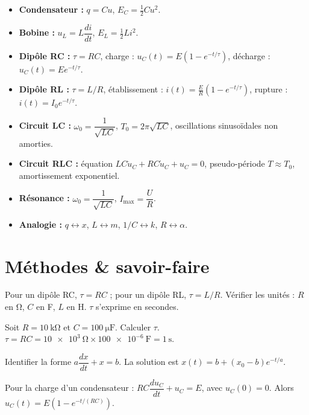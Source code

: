 \begin{synthese}
\begin{itemize}
  \item \textbf{Condensateur :} $q = C u$, $E_C = \frac{1}{2} C u^2$.
  \item \textbf{Bobine :} $u_L = L \dfrac{di}{dt}$, $E_L = \frac{1}{2} L i^2$.
  \item \textbf{Dipôle RC :} $\tau = RC$, charge : $u_C(t) = E(1 - e^{-t/\tau})$, décharge : $u_C(t) = E e^{-t/\tau}$.
  \item \textbf{Dipôle RL :} $\tau = L/R$, établissement : $i(t) = \frac{E}{R}(1 - e^{-t/\tau})$, rupture : $i(t) = I_0 e^{-t/\tau}$.
  \item \textbf{Circuit LC :} $\omega_0 = \dfrac{1}{\sqrt{LC}}$, $T_0 = 2\pi\sqrt{LC}$, oscillations sinusoïdales non amorties.
  \item \textbf{Circuit RLC :} équation $LC \ddot{u}_C + RC \dot{u}_C + u_C = 0$, pseudo-période $T \approx T_0$, amortissement exponentiel.
  \item \textbf{Résonance :} $\omega_0 = \dfrac{1}{\sqrt{LC}}$, $I_{\text{max}} = \dfrac{U}{R}$.
  \item \textbf{Analogie :} $q \leftrightarrow x$, $L \leftrightarrow m$, $1/C \leftrightarrow k$, $R \leftrightarrow \alpha$.
\end{itemize}
\end{synthese}

\section{Méthodes \& savoir-faire}

Pour un dipôle RC, $\tau = RC$ ; pour un dipôle RL, $\tau = L/R$. Vérifier les unités : $R$ en \si{\ohm}, $C$ en \si{\farad}, $L$ en \si{\henry}. $\tau$ s’exprime en secondes.

\begin{exemple}
Soit $R = \SI{10}{\kilo\ohm}$ et $C = \SI{100}{\micro\farad}$. Calculer $\tau$.
\medskip\\
$\tau = RC = \SI{10e3}{\ohm} \times \SI{100e-6}{\farad} = \SI{1}{\second}$.
\end{exemple}

Identifier la forme $a \dfrac{dx}{dt} + x = b$. La solution est $x(t) = b + (x_0 - b) e^{-t/a}$.

\begin{exemple}
Pour la charge d’un condensateur : $RC \dfrac{du_C}{dt} + u_C = E$, avec $u_C(0)=0$. Alors $u_C(t) = E(1 - e^{-t/(RC)})$.
\end{exemple}

